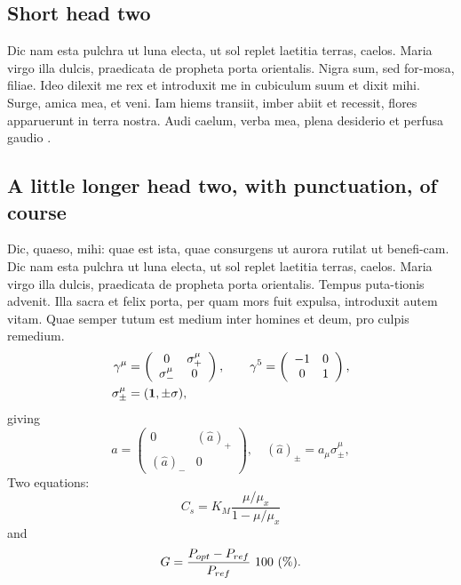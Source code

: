 \documentclass{infor}
\theoremstyle{remark}
\begin{document}
\subsection{Short head two}

Dic nam esta pulchra ut luna electa, ut sol replet laetitia terras,
caelos. Maria virgo illa dulcis, praedicata de propheta porta
orientalis. Nigra sum, sed for-mosa, filiae. Ideo dilexit me rex et \cite{Anderson}
introduxit me in cubiculum suum et dixit mihi. Surge, amica mea, et
veni. Iam hiems transiit, imber abiit et recessit, flores apparuerunt in
terra nostra. Audi caelum, verba mea, plena desiderio et perfusa gaudio \cite{XiuliChao1999,powergrid1}.

\subsection{A little longer head two, with punctuation, of course}

Dic, quaeso, mihi: quae est ista, quae consurgens ut aurora rutilat
ut benefi-cam.  Dic nam esta pulchra ut luna electa, ut sol replet
laetitia terras, caelos.  Maria virgo illa dulcis, praedicata de
propheta porta orientalis. Tempus puta-tionis advenit. Illa sacra et
felix porta, per quam mors fuit expulsa, introduxit autem vitam. Quae
semper tutum est medium inter homines et deum, pro culpis remedium.
%
\begin{align}
\gamma^\mu & =
\left(
%
\begin{array}{cc}
0            & \sigma^\mu_+ \\
\sigma^\mu_- & 0            
\end{array}
%
\right),
\qquad
\gamma^5= \left(
%
\begin{array}{cc}
-1 & 0 \\
0  & 1
\end{array}
%
\right),\nonumber\\
\sigma^\mu_{\pm} & = ({\bf1} ,\pm\sigma) , \nonumber
\end{align}
%
giving
%
\begin{equation}
\hat a= \left(
%
\begin{array}{cc}
0          & (\hat a)_+ \\
(\hat a)_- & 0
\end{array}
%
\right),\quad(\hat a)_\pm=a_\mu\sigma^\mu_\pm,
\end{equation}
%
Two equations:
%
\begin{equation}
C_{s} = K_{M} \frac{\mu/\mu_{x}}{1-\mu/\mu_{x}} \label{ccs}
\end{equation}
%
and
%
\begin{equation}
G = \frac{P_{\rm opt} - P_{\rm ref}}{P_{\rm ref}}\ 100\ (\%).
\end{equation}
\end{document}
